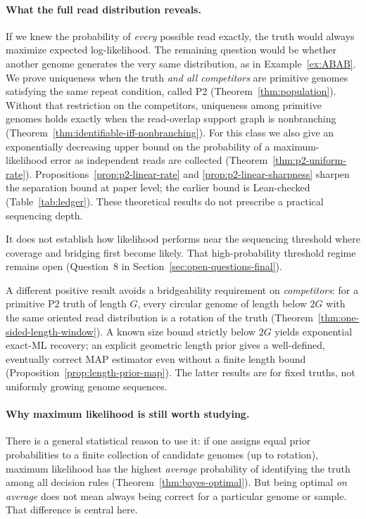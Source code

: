 \paragraph{What the full read distribution reveals.}
If we knew the probability of \emph{every} possible read exactly,
the truth would always maximize expected log-likelihood. The
remaining question would be whether another genome generates
the very same distribution, as in Example~\ref{ex:ABAB}.
We prove uniqueness when the truth \emph{and all competitors}
are primitive genomes satisfying the same repeat condition, called P2
(Theorem~\ref{thm:population}). Without that restriction on the
competitors, uniqueness among primitive genomes holds exactly
when the read-overlap support graph is nonbranching
(Theorem~\ref{thm:identifiable-iff-nonbranching}). For this class we also give an
exponentially decreasing upper bound on the probability of a
maximum-likelihood error as independent reads are collected
(Theorem~\ref{thm:p2-uniform-rate}).
Propositions~\ref{prop:p2-linear-rate} and
\ref{prop:p2-linear-sharpness} sharpen the separation bound
at paper level; the earlier bound is Lean-checked
(Table~\ref{tab:ledger}). These theoretical results do
not prescribe a practical sequencing depth.

It does not establish how likelihood performs near the sequencing
threshold where coverage and bridging first become likely.
That high-probability threshold regime remains open (Question~8
in Section~\ref{sec:open-questions-final}).

A different positive result avoids a bridgeability requirement
on \emph{competitors}: for a primitive P2 truth of length $G$,
every circular genome of length below $2G$ with the same
oriented read distribution is a rotation of the truth
(Theorem~\ref{thm:one-sided-length-window}).
A known size bound strictly below $2G$ yields exponential
exact-ML recovery; an explicit geometric length prior
gives a well-defined, eventually correct MAP estimator
even without a finite length bound
(Proposition~\ref{prop:length-prior-map}).
The latter results are for fixed truths, not uniformly
growing genome sequences.

\paragraph{Why maximum likelihood is still worth studying.}
There is a general statistical reason to use it: if one assigns
equal prior probabilities to a finite collection of candidate
genomes (up to rotation), maximum likelihood has the highest
\emph{average} probability of identifying the truth among all
decision rules (Theorem~\ref{thm:bayes-optimal}). But being optimal
\emph{on average} does not mean always being correct for a
particular genome or sample. That difference is central here.

